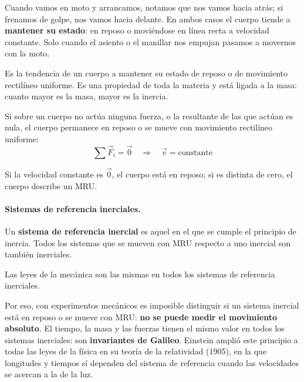 Cuando vamos en moto y arrancamos, notamos que nos vamos hacia atrás; si frenamos de golpe, nos vamos hacia delante. En ambos casos
el cuerpo tiende a \textbf{mantener su estado}: en reposo o moviéndose en línea recta a velocidad constante. Solo cuando el asiento
o el manillar nos empujan pasamos a movernos con la moto.

\begin{definition}[Inercia]
    Es la tendencia de un cuerpo a mantener su estado de reposo o de movimiento rectilíneo uniforme. Es una propiedad de toda la
    materia y está ligada a la masa: cuanto mayor es la masa, mayor es la inercia.
\end{definition}

\begin{definition}
    Si sobre un cuerpo no actúa ninguna fuerza, o la resultante de las que actúan es nula, el cuerpo permanece en reposo o se mueve
    con movimiento rectilíneo uniforme:
    \[ \sum \vec{F}_i = \vec{0} \quad\Longrightarrow\quad \vec{v} = \text{constante} \]
\end{definition}

Si la velocidad constante es \(\vec{0}\), el cuerpo está en reposo; si es distinta de cero, el cuerpo describe un MRU.

\paragraph{Sistemas de referencia inerciales.} Un \textbf{sistema de referencia inercial} es aquel en el que se cumple el principio
de inercia. Todos los sistemas que se mueven con MRU respecto a uno inercial son también inerciales.

\begin{definition}
    Las leyes de la mecánica son las mismas en todos los sistemas de referencia inerciales.
\end{definition}

Por eso, con experimentos mecánicos es imposible distinguir si un sistema inercial está en reposo o se mueve con MRU: \textbf{no se
puede medir el movimiento absoluto}. El tiempo, la masa y las fuerzas tienen el mismo valor en todos los sistemas inerciales: son
\textbf{invariantes de Galileo}. Einstein amplió este principio a todas las leyes de la física en su teoría de la relatividad
(1905), en la que longitudes y tiempos sí dependen del sistema de referencia cuando las velocidades se acercan a la de la luz.

